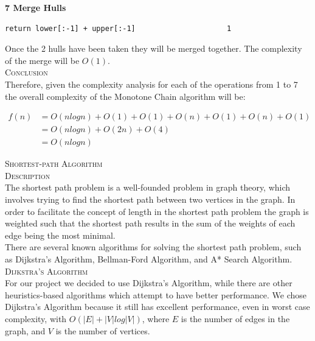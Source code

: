\documentclass[pdftex,12pt,a4paper]{article}
\newcommand{\nspace}{\\[0.25cm]}
\newcommand{\lspace}{\\[0.50cm]}
\newcommand{\Lspace}{\\[1.0cm]}
\begin{document}
{\bf \large 7 Merge Hulls}
\begin{verbatim}
return lower[:-1] + upper[:-1]                     1
\end{verbatim}

Once the 2 hulls have been taken they will be merged together. The complexity of the merge will be $O(1)$.\lspace




\newpage
\textsc{\Large Conclusion} \hfill \nspace

Therefore, given the complexity analysis for each of the operations from 1 to 7 the overall complexity of the Monotone Chain algorithm will be:

\begin{equation}
\begin{split}
f(n) &= O(nlogn) + O(1) + O(1) + O(n) + O(1) + O(n) + O(1)\\
     &= O(nlogn) + O(2n) + O(4)\\
     &= O(nlogn)
\end{split}
\end{equation}
















\newpage
\textsc{\Huge Shortest-path Algorithm} \hfill \Lspace

\textsc{\Large Description} \hfill \nspace

The shortest path problem is a well-founded problem in graph theory, which involves trying to find the shortest path between two vertices in the graph. In order to facilitate the concept of length in the shortest path problem the graph is weighted such that the shortest path results in the sum of the weights of each edge being the most minimal.\nspace

There are several known algorithms for solving the shortest path problem, such as Dijkstra's Algorithm, Bellman-Ford Algorithm, and A* Search Algorithm.\lspace



\textsc{\Large Dijkstra's Algorithm} \hfill \nspace

For our project we decided to use Dijkstra's Algorithm, while there are other heuristics-based algorithms which attempt to have better performance. We chose Dijkstra's Algorithm because it still has excellent performance, even in worst case complexity, with $O(|E| + |V| log |V|) $\cite{cormen2001introduction}, where $E$ is the number of edges in the graph, and $V$ is the number of vertices.\nspace
\end{document}

